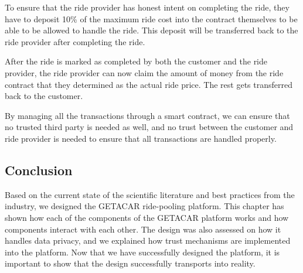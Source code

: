 To ensure that the ride provider has honest intent on completing the ride, they have to deposit 10\% of the maximum ride cost into the contract themselves to be able to be allowed to handle the ride. This deposit will be transferred back to the ride provider after completing the ride. 

After the ride is marked as completed by both the customer and the ride provider, the ride provider can now claim the amount of money from the ride contract that they determined as the actual ride price. The rest gets transferred back to the customer.

By managing all the transactions through a smart contract, we can ensure that no trusted third party is needed as well, and no trust between the customer and ride provider is needed to ensure that all transactions are handled properly.

\subsection{Conclusion}
Based on the current state of the scientific literature and best practices from the industry, we designed the GETACAR ride-pooling platform. This chapter has shown how each of the components of the GETACAR platform works and how components interact with each other. The design was also assessed on how it handles data privacy, and we explained how trust mechanisms are implemented into the platform. Now that we have successfully designed the platform, it is important to show that the design successfully transports into reality. 